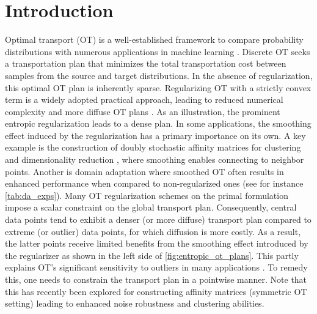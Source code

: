 
\section{Introduction}

Optimal transport (OT) is a well-established framework to compare probability distributions with numerous applications in machine learning \citep{arjovsky2017wasserstein, ozair2019wasserstein, peyre2019computational}.
Discrete OT seeks a transportation plan that minimizes the total transportation cost between samples from the source and target distributions.
In the absence of regularization, this optimal OT plan is inherently sparse. 
Regularizing OT with a strictly convex term is a widely adopted practical approach, leading to reduced numerical complexity and more diffuse OT plans \citep{peyre2019computational}.
As an illustration, the prominent entropic regularization \citep{cuturi2013sinkhorn} leads to a dense plan.
In some applications, the smoothing effect induced by the regularization has a primary importance on its own. A key example is the construction of doubly stochastic affinity matrices for clustering and dimensionality reduction \citep{landa2021doubly,Zass}, where smoothing enables connecting to neighbor points.
Another is domain adaptation \citep{courty2017joint} where smoothed OT often results in enhanced performance when compared to non-regularized ones (see for instance \cref{tab:da_exps}). Many OT regularization schemes on the primal formulation impose a scalar constraint on the global transport plan.
Consequently, central data points tend to exhibit a denser (or more diffuse) transport plan compared to extreme (or outlier) data points, for which diffusion is more costly. As a result, the latter points receive limited benefits from the smoothing effect introduced by the regularizer as shown in the left side of \cref{fig:entropic_ot_plans}. This partly explains OT's significant sensitivity to outliers in many applications \citep{mukherjee2021outlier, pmlr-v202-chuang23a}. 
To remedy this, one needs to constrain the transport plan in a pointwise manner.
Note that this has recently been explored for constructing affinity matrices \citep{van2023snekhorn} (\ie symmetric OT setting) leading to enhanced noise robustness and clustering abilities.

